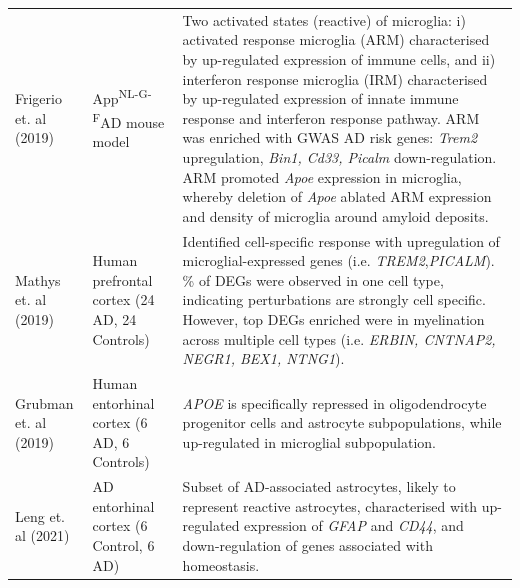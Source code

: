 \begin{landscape}
\begin{longtable}[c]{p{4cm}p{4cm}p{18cm}}
		\centering Frigerio et. al (2019)\cite{Frigerio2019} &
		\centering App\textsuperscript{NL-G-F}\newline AD mouse model  &
		\tabitem Two activated states (reactive) of microglia: i) activated response microglia (ARM) characterised by up-regulated expression of immune cells, and ii) interferon response microglia (IRM) characterised by up-regulated expression of innate immune response and interferon response pathway.  \newline
		\tabitem ARM was enriched with GWAS AD risk genes: \textit{Trem2} upregulation, \textit{Bin1, Cd33, Picalm} down-regulation.  \newline
		\tabitem ARM promoted \textit{Apoe} expression in microglia, whereby deletion of \textit{Apoe} ablated ARM expression and density of microglia around amyloid deposits. \\
		\hdashline[0.5pt/5pt]
		
		\centering Mathys et. al (2019)\cite{Mathys2019} &
		\centering Human prefrontal cortex (24 AD, 24 Controls)  &
		\tabitem Identified cell-specific response with upregulation of microglial-expressed genes (i.e. \textit{TREM2},\textit{PICALM}). \newline
		\tabitem 95\% of DEGs were observed in one cell type, indicating perturbations are strongly cell specific.  However, top DEGs enriched were in myelination across multiple cell types (i.e. \textit{ERBIN, CNTNAP2, NEGR1, BEX1, NTNG1}).   \\
		\hdashline[0.5pt/5pt]
		
		\centering Grubman et. al (2019)\cite{Grubman2019} &
		\centering Human entorhinal cortex (6 AD, 6 Controls)  &
		\tabitem \textit{APOE} is specifically repressed in oligodendrocyte progenitor cells and astrocyte subpopulations, while up-regulated in microglial subpopulation.  \\
		\hdashline[0.5pt/5pt]
		
		\centering Leng et. al (2021)\cite{Leng2021} &
		\centering AD entorhinal cortex \newline(6 Control, 6 AD)  &
		\tabitem Subset of AD-associated astrocytes, likely to represent reactive astrocytes, characterised with up-regulated expression of \textit{GFAP} and \textit{CD44}, and down-regulation of genes associated with homeostasis.  		
		\\* \bottomrule
	\end{longtable}
\end{landscape}
\restoregeometry



